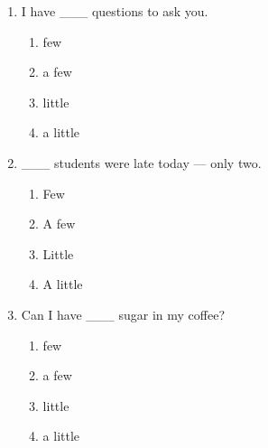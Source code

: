 \documentclass[11pt,a4paper]{ctexart}
\begin{document}
\begin{enumerate}[leftmargin=*,itemsep=4pt]
\begin{enumerate}[label=\Alph*.,leftmargin=2em,itemsep=1pt,topsep=2pt]
\item a little
\end{enumerate}
\item I have \_\_\_ questions to ask you.
\begin{enumerate}[label=\Alph*.,leftmargin=2em,itemsep=1pt,topsep=2pt]
\item few
\item a few
\item little
\item a little
\end{enumerate}
\item \_\_\_ students were late today — only two.
\begin{enumerate}[label=\Alph*.,leftmargin=2em,itemsep=1pt,topsep=2pt]
\item Few
\item A few
\item Little
\item A little
\end{enumerate}
\item Can I have \_\_\_ sugar in my coffee?
\begin{enumerate}[label=\Alph*.,leftmargin=2em,itemsep=1pt,topsep=2pt]
\item few
\item a few
\item little
\item a little
\end{enumerate}
\end{enumerate}
\end{document}
